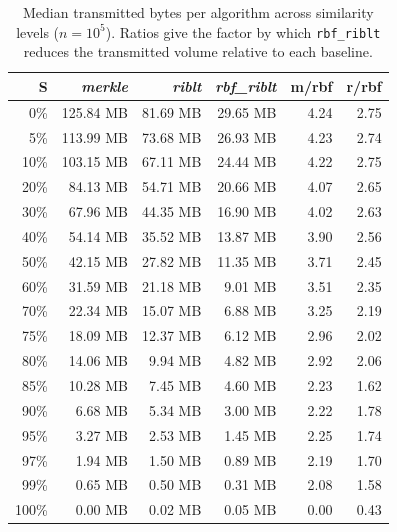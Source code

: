 \begin{table}[!htbp]
  \centering
  \caption{Median transmitted bytes per algorithm across similarity levels
  ($n{=}10^5$). Ratios give the factor by which \texttt{rbf\_riblt} reduces
  the transmitted volume relative to each baseline.}
  \label{tab:transmitted_bytes_by_similarity}
  \begin{tabular}{rrrrrr}
  \toprule
  S & \textit{merkle} & \textit{riblt} & \textit{rbf\_riblt} & m/rbf & r/rbf \\
  \midrule
  0\% & 125.84 MB & 81.69 MB & 29.65 MB & 4.24 & 2.75 \\
  5\% & 113.99 MB & 73.68 MB & 26.93 MB & 4.23 & 2.74 \\
  10\% & 103.15 MB & 67.11 MB & 24.44 MB & 4.22 & 2.75 \\
  20\% & 84.13 MB & 54.71 MB & 20.66 MB & 4.07 & 2.65 \\
  30\% & 67.96 MB & 44.35 MB & 16.90 MB & 4.02 & 2.63 \\
  40\% & 54.14 MB & 35.52 MB & 13.87 MB & 3.90 & 2.56 \\
  50\% & 42.15 MB & 27.82 MB & 11.35 MB & 3.71 & 2.45 \\
  60\% & 31.59 MB & 21.18 MB & 9.01 MB & 3.51 & 2.35 \\
  70\% & 22.34 MB & 15.07 MB & 6.88 MB & 3.25 & 2.19 \\
  75\% & 18.09 MB & 12.37 MB & 6.12 MB & 2.96 & 2.02 \\
  80\% & 14.06 MB & 9.94 MB & 4.82 MB & 2.92 & 2.06 \\
  85\% & 10.28 MB & 7.45 MB & 4.60 MB & 2.23 & 1.62 \\
  90\% & 6.68 MB & 5.34 MB & 3.00 MB & 2.22 & 1.78 \\
  95\% & 3.27 MB & 2.53 MB & 1.45 MB & 2.25 & 1.74 \\
  97\% & 1.94 MB & 1.50 MB & 0.89 MB & 2.19 & 1.70 \\
  99\% & 0.65 MB & 0.50 MB & 0.31 MB & 2.08 & 1.58 \\
  100\% & 0.00 MB & 0.02 MB & 0.05 MB & 0.00 & 0.43 \\
  \bottomrule
  \end{tabular}
\end{table}
